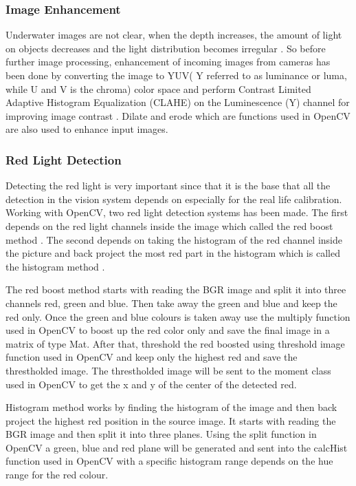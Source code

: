 \subsubsection{Image Enhancement} 
Underwater images are not clear, when the depth increases, the amount of light on objects decreases and the light distribution becomes irregular \cite{Image_Enhancement}. So before further image processing, enhancement of  incoming images from cameras has been done  by  converting the image to YUV( Y referred to as luminance or luma, while U and V is the chroma) color space and perform Contrast Limited Adaptive Histogram Equalization (CLAHE) on the Luminescence (Y) channel for improving image contrast \cite{Image_Enhancement}. Dilate and erode which are functions used in OpenCV are also used to enhance input images.

\subsubsection{Red Light Detection}
Detecting the red light is very important since that it is the base that all the detection in the vision system depends on especially for the real life calibration. Working with OpenCV, two red light detection systems has been made. The first depends on the red light channels inside the image which called the red boost method \cite{Red_boost_Method}. The second depends on taking the histogram of the red channel inside the picture and back project the most red part in the histogram which is called the histogram method \cite{Histogram_Method}.

The red boost method starts with reading the BGR image and split it into three channels red, green and blue. Then take away the green and blue and  keep the red only. 
Once the green and blue colours is taken away use the multiply function used in OpenCV to boost up the red color only and save the final image in a matrix of type Mat. 
After that, threshold the red boosted using threshold image function used in OpenCV and keep only the highest red and save the threstholded image. The threstholded image will be sent to the moment class used in OpenCV to get the x and y of the center of the detected red.
 
Histogram method works by finding the histogram of the image and then back project the highest red position in the source image. It starts with reading the BGR image and then split it into three planes. Using the split function in OpenCV a green, blue and red plane will be generated and sent into the calcHist function used in OpenCV with a specific histogram range depends on the hue range for the red colour. 

